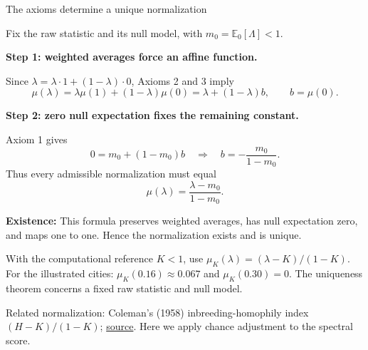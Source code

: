 \documentclass[aspectratio=169,10pt]{beamer}
\begin{document}
\begin{frame}[shrink=0]{The axioms determine a unique normalization}
\small

Fix the raw statistic and its null model, with
$m_0=\mathbb{E}_0[\Lambda]<1$.

\textbf{Step 1: weighted averages force an affine function.}

Since $\lambda=\lambda\cdot1+(1-\lambda)\cdot0$,
Axioms 2 and 3 imply
\[
    \mu(\lambda)
      =\lambda\mu(1)+(1-\lambda)\mu(0)
      =\lambda+(1-\lambda)b,
    \qquad b=\mu(0).
\]

\textbf{Step 2: zero null expectation fixes the remaining constant.}

Axiom 1 gives
\[
    0=m_0+(1-m_0)b
    \quad\Longrightarrow\quad
    b=-\frac{m_0}{1-m_0}.
\]
Thus every admissible normalization must equal
\[
    \boxed{\displaystyle
       \mu(\lambda)=\frac{\lambda-m_0}{1-m_0}}.
\]

\textbf{Existence:} This formula preserves weighted averages,
has null expectation zero, and maps one to one.
Hence the normalization exists and is unique.

\medskip
{\footnotesize
With the computational reference $K<1$, use
$\mu_K(\lambda)=(\lambda-K)/(1-K)$.
For the illustrated cities:
$\mu_K(0.16)\approx0.067$ and $\mu_K(0.30)=0$.
The uniqueness theorem concerns a fixed raw statistic and null model.
\par\smallskip
Related normalization: Coleman's (1958) inbreeding-homophily index
$(H-K)/(1-K)$;
\href{https://doi.org/10.17730/humo.17.4.q5604m676260q8n7}{source}.
Here we apply chance adjustment to the spectral score.
}

\end{frame}
\end{document}

